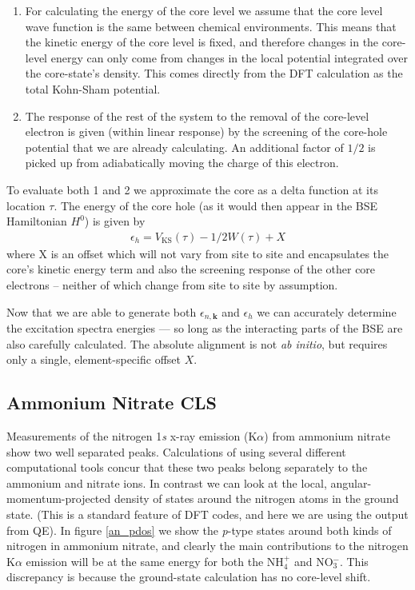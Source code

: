 \documentclass[11pt]{report}
\begin{document}
\begin{enumerate}
\item
For calculating the energy of the core level we assume that the core level wave function is the same between chemical environments. This means that the kinetic energy of the core level is fixed, and therefore changes in the core-level energy can only come from changes in the local potential integrated over the core-state's density. This comes directly from the DFT calculation as the total Kohn-Sham potential.
\item The response of the rest of the system to the removal of the core-level electron is given (within linear response) by the screening of the core-hole potential that we are already calculating. An additional factor of $1/2$ is picked up from adiabatically moving the charge of this electron. 
\end{enumerate}
To evaluate both 1 and 2 we approximate the core as a delta function at its location $\tau$. 
The energy of the core hole (as it would then appear in the BSE Hamiltonian $H^0$) is given by
\begin{align}
\label{CLS_eqn}
\epsilon_h = V_\text{KS}(\tau) - 1/2 W(\tau) + X
\end{align}
where X is an offset which will not vary from site to site and encapsulates the core's kinetic energy term and also the screening response of the other core electrons -- neither of which change from site to site by assumption.

Now that we are able to generate both $\epsilon_{n,\mathbf{k}}$ and $\epsilon_h$ we can accurately determine the excitation spectra energies --- so long as the interacting parts of the BSE are also carefully calculated. 
The absolute alignment is not {\it ab initio}, but requires only a single, element-specific offset $X$.


\subsection{Ammonium Nitrate CLS}

Measurements of the nitrogen 1{\it s} x-ray emission (K$\alpha$) from ammonium nitrate show two well separated peaks. Calculations of using several different computational tools concur that these two peaks belong separately to the ammonium and nitrate ions.\cite{ANpapers} 
In contrast we can look at the local, angular-momentum-projected density of states around the nitrogen atoms in the ground state. (This is a standard feature of DFT codes, and here we are using the output from QE). In figure \ref{an_pdos} we show the {\it p}-type states around both kinds of nitrogen in ammonium nitrate, and clearly the main contributions to the nitrogen K$\alpha$ emission will be at the same energy for both the NH$_4^+$ and NO$_3^-$. This discrepancy is because the ground-state calculation has no core-level shift.
\end{document}
